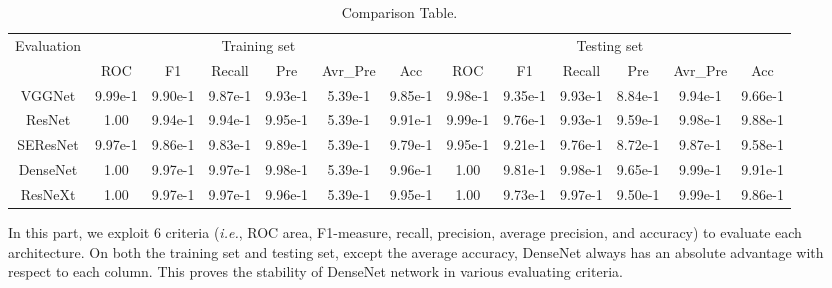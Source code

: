 \documentclass[10pt,twocolumn,letterpaper]{article}
\begin{document}
\begin{table}[h]

\scriptsize

\centering

\caption{Comparison Table.}

\label{comparetable}

\begin{tabular}{ccccccccccccc}
\\
\toprule

\multirow{2}{*}{Evaluation} &&& \multicolumn{2}{c}{Training set} &&&&& \multicolumn{2}{c}{Testing set} \\

\cmidrule(r){2-7}  \cmidrule(r){8-13}

&   ROC   & F1  & Recall   & Pre & Avr\_Pre  & Acc

&  ROC   & F1  & Recall   & Pre & Avr\_Pre  & Acc \\

\midrule

\textsf{VGGNet} &9.99e-1 &9.90e-1 &9.87e-1 &9.93e-1 &5.39e-1 &9.85e-1 &9.98e-1 &9.35e-1 &9.93e-1 &8.84e-1 &9.94e-1 &9.66e-1  \\

\textsf{ResNet}  &1.00 &9.94e-1 &9.94e-1 &9.95e-1 &5.39e-1 &9.91e-1 &9.99e-1 &9.76e-1 &9.93e-1 &9.59e-1 &9.98e-1 &9.88e-1  \\

\textsf{SEResNet}  &9.97e-1 &9.86e-1 &9.83e-1 &9.89e-1 &5.39e-1 &9.79e-1    &9.95e-1 &9.21e-1 &9.76e-1 &8.72e-1 &9.87e-1 &9.58e-1  \\

\textsf{DenseNet}  &1.00 &9.97e-1 &9.97e-1 &9.98e-1 &5.39e-1 &9.96e-1 &1.00 &9.81e-1 &9.98e-1 &9.65e-1 &9.99e-1 &9.91e-1   \\

\textsf{ResNeXt}  &1.00 &9.97e-1 &9.97e-1 &9.96e-1 &5.39e-1 &9.95e-1 &1.00 &9.73e-1 &9.97e-1 &9.50e-1 &9.99e-1 &9.86e-1  \\

\bottomrule

\end{tabular}

\end{table}

In this part, we exploit 6 criteria (\textit{i.e.}, ROC area, F1-measure, recall, precision, average precision, and accuracy) to evaluate each architecture. On both the training set and testing set, except the average accuracy, \textsf{DenseNet} always has an absolute advantage with respect to each column. This proves the stability of \textsf{DenseNet} network in various evaluating criteria.
\end{document}
